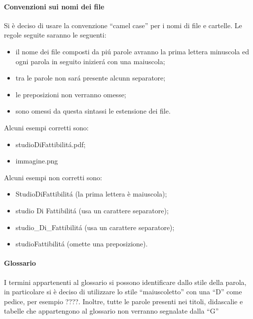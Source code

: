 			\paragraph{Convenzioni sui nomi dei file}
				Si è deciso di usare la convenzione ``camel case'' per i nomi di file e cartelle. Le regole seguite saranno le seguenti:
				\begin{itemize}
					\item il nome dei file composti da piú parole avranno la prima lettera minuscola ed ogni parola in seguito inizierá con una maiuscola;
					\item tra le parole non sará presente alcunn separatore;
					\item le preposizioni non verranno omesse;
					\item sono omessi da questa sintassi le estensione dei file.
				\end{itemize}
				Alcuni esempi corretti sono:
				\begin{itemize}
					\item studioDiFattibilitá.pdf;
					\item immagine.png
				\end{itemize}
				Alcuni esempi non corretti sono:
				\begin{itemize}
					\item StudioDiFattibilitá (la prima lettera è maiuscola);
					\item studio Di Fattibilitá (usa un carattere separatore);
					\item studio\_Di\_Fattibilitá (usa un carattere separatore);
					\item studioFattibilitá (omette una preposizione).
				\end{itemize}
			\paragraph{Glossario}
				I termini appartenenti al glossario si possono identificare dallo stile della parola, in particolare si è deciso di utilizzare lo stile ``maiuscoletto'' con una ``D'' come pedice, per esempio ????. Inoltre, tutte le parole presenti nei titoli, didascalie e tabelle che appartengono al glossario non verranno segnalate dalla ``G''

